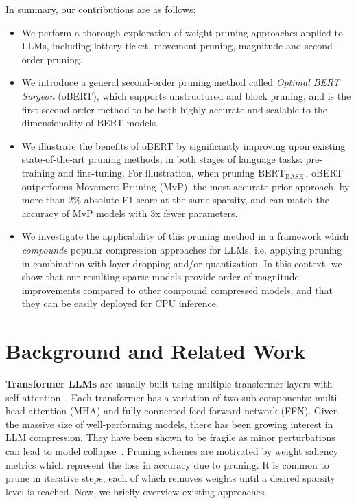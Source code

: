 \documentclass[11pt]{article}
\newcommand{\bert}{$\textrm{BERT}_{\textrm{BASE}}\,$}
\begin{document}
\noindent In summary, our contributions are as follows:
\begin{itemize}[noitemsep]
\setlength{\itemindent}{0.5em}
    \item We perform a thorough exploration of weight pruning approaches applied to LLMs, including lottery-ticket, movement pruning, magnitude and second-order pruning. 
    
    \item We introduce a general second-order pruning method called \emph{Optimal BERT Surgeon} (oBERT), which supports unstructured and block pruning, and is the first second-order method to be both highly-accurate and scalable to the dimensionality of BERT models. 
    
    \item We illustrate the benefits of oBERT by significantly improving upon existing state-of-the-art pruning methods, in both stages of language tasks: pre-training and fine-tuning. For illustration, when pruning \bert, oBERT outperforms Movement Pruning (MvP), the most accurate prior approach, by more than 2\% absolute F1 score at the same sparsity, and can match the accuracy of MvP models with 3x fewer parameters. 
    
    \item We investigate the applicability of this pruning method in a framework which \emph{compounds} popular compression approaches for LLMs, i.e. applying pruning in combination with layer dropping and/or quantization. In this context, we show that our resulting sparse models provide order-of-magnitude improvements compared to other compound compressed models, and that they can be easily deployed for CPU inference.
\end{itemize}
 
\section{Background and Related Work}

\noindent\textbf{Transformer LLMs} are usually built using multiple transformer layers with self-attention~\cite{Vaswani2017AttentionIA}. Each transformer has a variation of two sub-components: multi head attention (MHA) and fully connected feed forward network (FFN). 
Given the massive size of well-performing models, there has been growing interest in LLM compression. They have been shown to be fragile as minor perturbations can lead to model collapse~\cite{DBLP:journals/corr/abs-2105-06990}. Pruning schemes are motivated by weight saliency metrics which represent the loss in accuracy due to pruning. It is common to prune in iterative steps, each of which removes weights until a desired sparsity level is reached. Now, we briefly overview existing approaches.
\end{document}
